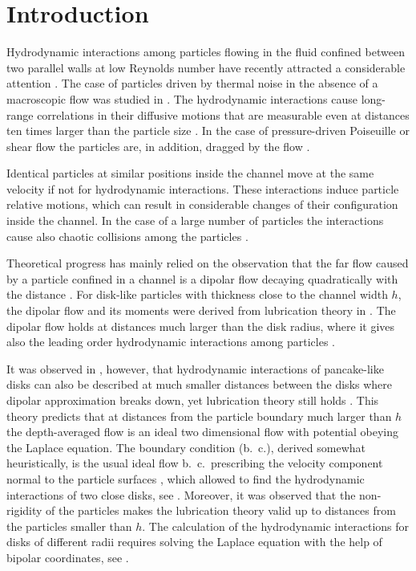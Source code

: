 \section{Introduction}

Hydrodynamic interactions among particles flowing in the fluid confined between two parallel walls at low Reynolds number have recently attracted a considerable attention \cite{carba,d1,d2,d3,d4,d5,d6,d7,anom,7,tlusty,tl2006,tl2012,is,sb,f1,f2,f3,f4,f5,f7,tl2014,tabeling,tab0}. The case of particles driven by thermal noise in the absence of a macroscopic flow was studied in \cite{carba,d1,d2,d3,d4,d5,d6,d7,anom,7,tlusty}. The hydrodynamic interactions cause long-range correlations 
in their diffusive motions 
that are measurable even at distances ten times larger than the particle size \cite{carba,anom}. In the case of
pressure-driven Poiseuille or shear flow the particles are, in addition, dragged by the flow \cite{f1,f2,f3,f4,f5,f7,tl2006,tl2012,tl2014,tabeling,tab0,is}.

Identical particles at similar positions inside the channel move at the same velocity if not for hydrodynamic interactions. These interactions induce particle relative motions, which can result in considerable changes of their configuration inside the channel. 
In the case of a large number of particles the interactions cause also chaotic collisions among the particles \cite{tl2014}.

Theoretical progress has mainly relied on the observation that the far flow caused by a particle confined in a channel is a dipolar flow decaying quadratically with the distance \cite{anom}. For disk-like particles with thickness close to the channel width $h$, the dipolar flow and its moments were derived from lubrication theory in \cite{tlusty}. The dipolar flow holds at distances much larger than the disk radius, where it gives also the leading order hydrodynamic interactions among particles \cite{tlusty,tl2006,tl2012,tl2014}.

It was observed in \cite{tl2012}, however, that hydrodynamic interactions of pancake-like disks can also be described at much smaller distances between the disks where dipolar approximation breaks down, yet lubrication theory still holds \cite{Batchelor,lubr,szeri,bruce}. This theory predicts that at distances from the particle boundary much larger than $h$ the depth-averaged flow is an ideal two dimensional flow with potential obeying the Laplace equation. The boundary condition (b.\ c.), derived somewhat heuristically, is the usual ideal flow b.\ c.\ prescribing  the velocity component normal to the particle surfaces \cite{ll}, which allowed to find the hydrodynamic interactions of two close disks, see \cite{tl2012}. Moreover, it was observed that the non-rigidity of the particles makes the lubrication theory valid up to distances from the particles smaller than $h$. The calculation of the hydrodynamic interactions for disks of different radii requires solving the Laplace equation with the help of bipolar coordinates, see \cite{is}.

